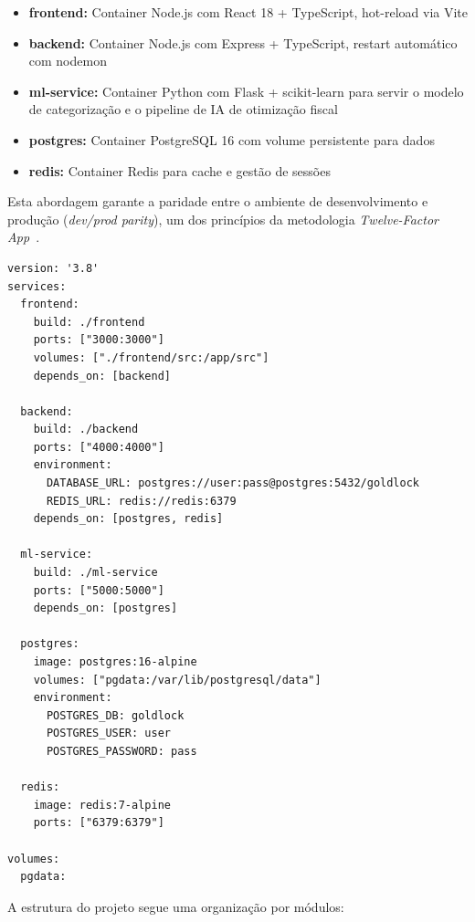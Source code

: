 \begin{itemize}
    \item \textbf{frontend:} Container Node.js com React 18 + TypeScript, hot-reload via Vite
    \item \textbf{backend:} Container Node.js com Express + TypeScript, restart automático com nodemon
    \item \textbf{ml-service:} Container Python com Flask + scikit-learn para servir o modelo de categorização e o pipeline de IA de otimização fiscal
    \item \textbf{postgres:} Container PostgreSQL 16 com volume persistente para dados
    \item \textbf{redis:} Container Redis para cache e gestão de sessões
\end{itemize}

Esta abordagem garante a paridade entre o ambiente de desenvolvimento e produção (\textit{dev/prod parity}), um dos princípios da metodologia \textit{Twelve-Factor App}~\cite{12factor}.

\begin{lstlisting}[caption={Excerto do ficheiro docker-compose.yml.},label={lst:docker}]
version: '3.8'
services:
  frontend:
    build: ./frontend
    ports: ["3000:3000"]
    volumes: ["./frontend/src:/app/src"]
    depends_on: [backend]

  backend:
    build: ./backend
    ports: ["4000:4000"]
    environment:
      DATABASE_URL: postgres://user:pass@postgres:5432/goldlock
      REDIS_URL: redis://redis:6379
    depends_on: [postgres, redis]

  ml-service:
    build: ./ml-service
    ports: ["5000:5000"]
    depends_on: [postgres]

  postgres:
    image: postgres:16-alpine
    volumes: ["pgdata:/var/lib/postgresql/data"]
    environment:
      POSTGRES_DB: goldlock
      POSTGRES_USER: user
      POSTGRES_PASSWORD: pass

  redis:
    image: redis:7-alpine
    ports: ["6379:6379"]

volumes:
  pgdata:
\end{lstlisting}

A estrutura do projeto segue uma organização por módulos:

